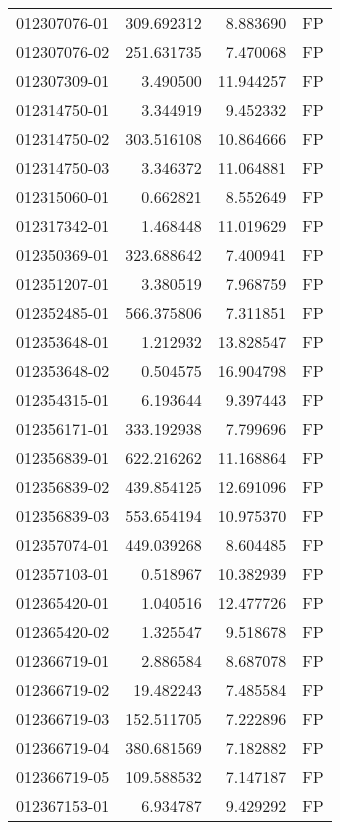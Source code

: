 \begin{tabular}{lrrl}
012307076-01 &  309.692312 &       8.883690 &   FP \\
012307076-02 &  251.631735 &       7.470068 &   FP \\
012307309-01 &    3.490500 &      11.944257 &   FP \\
012314750-01 &    3.344919 &       9.452332 &   FP \\
012314750-02 &  303.516108 &      10.864666 &   FP \\
012314750-03 &    3.346372 &      11.064881 &   FP \\
012315060-01 &    0.662821 &       8.552649 &   FP \\
012317342-01 &    1.468448 &      11.019629 &   FP \\
012350369-01 &  323.688642 &       7.400941 &   FP \\
012351207-01 &    3.380519 &       7.968759 &   FP \\
012352485-01 &  566.375806 &       7.311851 &   FP \\
012353648-01 &    1.212932 &      13.828547 &   FP \\
012353648-02 &    0.504575 &      16.904798 &   FP \\
012354315-01 &    6.193644 &       9.397443 &   FP \\
012356171-01 &  333.192938 &       7.799696 &   FP \\
012356839-01 &  622.216262 &      11.168864 &   FP \\
012356839-02 &  439.854125 &      12.691096 &   FP \\
012356839-03 &  553.654194 &      10.975370 &   FP \\
012357074-01 &  449.039268 &       8.604485 &   FP \\
012357103-01 &    0.518967 &      10.382939 &   FP \\
012365420-01 &    1.040516 &      12.477726 &   FP \\
012365420-02 &    1.325547 &       9.518678 &   FP \\
012366719-01 &    2.886584 &       8.687078 &   FP \\
012366719-02 &   19.482243 &       7.485584 &   FP \\
012366719-03 &  152.511705 &       7.222896 &   FP \\
012366719-04 &  380.681569 &       7.182882 &   FP \\
012366719-05 &  109.588532 &       7.147187 &   FP \\
012367153-01 &    6.934787 &       9.429292 &   FP \\

\end{tabular}
